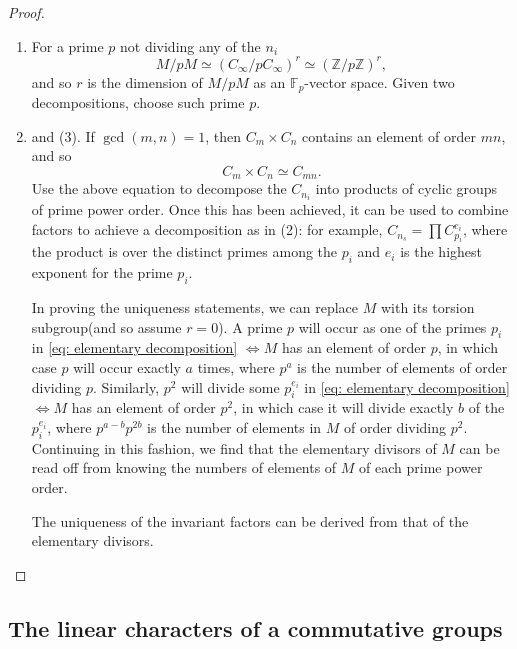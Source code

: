 \begin{proof}
  \begin{enumerate}
    \item For a prime \( p \) not dividing any of the \( n_i \)
      \[
        M / p M \simeq (C_\infty / p C_\infty)^r \simeq (\mathbb{Z} / p \mathbb{Z})^r,
      \]
      and so \( r \) is the dimension of \( M / p M \) as an \( \mathbb{F}_p
      \)-vector space. Given two decompositions, choose such prime \( p \).
    \item and (3).
      If \( \gcd(m, n) = 1 \), then \( C_m \times C_n \) contains an element of
      order \( mn \), and so
      \[
        C_m \times C_n \simeq C_{mn}.
      \]
      Use the above equation to decompose the \( C_{n_i} \) into products of
      cyclic groups of prime power order. Once this has been achieved, it can be
      used to combine factors to achieve a decomposition as in (2): for example,
      \( C_{n_s} = \prod C_{p_i}^{e_i} \), where the product is over the
      distinct primes among the \( p_i \) and \( e_i \) is the highest exponent
      for the prime \( p_i \).

      In proving the uniqueness statements, we can replace \( M \) with its
      torsion subgroup(and so assume \( r = 0 \)). A prime \( p \) will occur as
      one of the primes \( p_i \) in \eqref{eq: elementary decomposition} \(
      \iff M \) has an element of order \( p \), in which case \( p \) will
      occur exactly \( a \) times, where \( p^a \) is the number of elements of
      order dividing \( p \). Similarly, \( p^2 \) will divide some \( p^{e_i}_i
      \) in \eqref{eq: elementary decomposition} \( \iff M  \) has an element of
      order \( p^2 \), in which case it will divide exactly \( b \) of the \(
      p^{e_i}_i \), where \( p^{a - b}p^{2b} \) is the number of elements in \(
      M \) of order dividing \( p^2 \). Continuing in this fashion, we find that
      the elementary divisors of \( M \) can be read off from knowing the
      numbers of elements of \( M \) of each prime power order.

      The uniqueness of the invariant factors can be derived from that of the
      elementary divisors.
  \end{enumerate}
\end{proof}

\subsection{The linear characters of a commutative groups}

